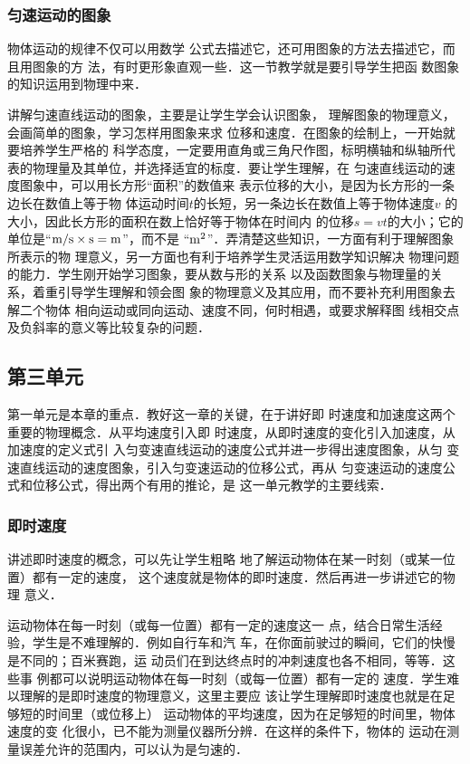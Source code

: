 \subsubsection{匀速运动的图象}

物体运动的规律不仅可以用数学
公式去描述它，还可用图象的方法去描述它，而且用图象的方
法，有时更形象直观一些．这一节教学就是要引导学生把函
数图象的知识运用到物理中来．

讲解匀速直线运动的图象，主要是让学生学会认识图象，
理解图象的物理意义，会画简单的图象，学习怎样用图象来求
位移和速度．在图象的绘制上，一开始就要培养学生严格的
科学态度，一定要用直角或三角尺作图，标明横轴和纵轴所代
表的物理量及其单位，并选择适宜的标度．要让学生理解，在
匀速直线运动的速度图象中，可以用长方形“面积”的数值来
表示位移的大小，是因为长方形的一条边长在数值上等于物
体运动时间$t$的长短，另一条边长在数值上等于物体速度$v$
的大小，因此长方形的面积在数上恰好等于物体在时间内
的位移$s=vt$的大小；它的单位是“${\rm m/s\times s=m}$”，而不是
“${\rm m^2}$”．弄清楚这些知识，一方面有利于理解图象所表示的物
理意义，另一方面也有利于培养学生灵活运用数学知识解决
物理问题的能力．学生刚开始学习图象，要从数与形的关系
以及函数图象与物理量的关系，着重引导学生理解和领会图
象的物理意义及其应用，而不要补充利用图象去解二个物体
相向运动或同向运动、速度不同，何时相遇，或要求解释图
线相交点及负斜率的意义等比较复杂的问题．

\subsection{第三单元}

第一单元是本章的重点．教好这一章的关键，在于讲好即
时速度和加速度这两个重要的物理概念．从平均速度引入即
时速度，从即时速度的变化引入加速度，从加速度的定义式引
入匀变速直线运动的速度公式并进一步得出速度图象，从匀
变速直线运动的速度图象，引入匀变速运动的位移公式，再从
匀变速运动的速度公式和位移公式，得出两个有用的推论，是
这一单元教学的主要线索．

\subsubsection{即时速度}

讲述即时速度的概念，可以先让学生粗略
地了解运动物体在某一时刻（或某一位置）都有一定的速度，
这个速度就是物体的即时速度．然后再进一步讲述它的物理
意义．

运动物体在每一时刻（或每一位置）都有一定的速度这一
点，结合日常生活经验，学生是不难理解的．例如自行车和汽
车，在你面前驶过的瞬间，它们的快慢是不同的；百米赛跑，运
动员们在到达终点时的冲刺速度也各不相同，等等．这些事
例都可以说明运动物体在每一时刻（或每一位置）都有一定的
速度．学生难以理解的是即时速度的物理意义，这里主要应
该让学生理解即时速度也就是在足够短的时间里（或位移上）
运动物体的平均速度，因为在足够短的时间里，物体速度的变
化很小，已不能为测量仪器所分辨．在这样的条件下，物体的
运动在测量误差允许的范围内，可以认为是匀速的．

